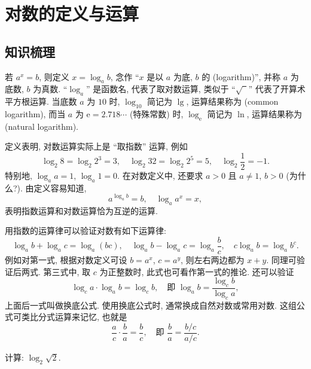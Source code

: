   \section{对数的定义与运算}

  \subsection{知识梳理}
    若 $a^x=b$, 则定义 $x=\log_a b$, 念作 ``$x$ 是以 $a$ 为底, $b$ 的 (logarithm)'', 
    并称 $a$ 为底数, $b$ 为真数. ``$\log_a$'' 是函数名, 代表了取对数运算, 
    类似于 ``$\sqrt{\phantom{2}}$'' 代表了开算术平方根运算. 当底数 $a$ 为 $10$ 时, 
    $\log_{10}$ 简记为  $\lg$, 运算结果称为 (common logarithm), 
    而当 $a$ 为 $\mathrm{e}= 2.718\cdots$ (特殊常数) 时, 
    $\log_{\mathrm{e}}$ 简记为  $\ln$, 运算结果称为 (natural logarithm). 
     
    定义表明, 对数运算实际上是 ``取指数'' 运算, 例如
    \[\log_2 8= \log_2 2^3= 3,\quad \log_2 32= \log_2 2^5= 5,\quad
      \log_2 \frac12= -1.\]
    特别地, $\log_a a=1$, $\log_a 1=0$. 在对数定义中, 还要求 $a>0$ 且 $a\neq 1$, $b>0$ (为什么?). 由定义容易知道, 
    \[a^{\log_a b}=b,\quad \log_a a^x=x,\]
    表明指数运算和对数运算恰为互逆的运算. 
    
    用指数的运算律可以验证对数有如下运算律:
    \[\log_a b+ \log_a c= \log_a (bc),\quad 
      \log_a b- \log_a c= \log_a \frac{b}c,\quad
      c\log_a b= \log_a b^c.\]
    例如对第一式, 根据对数定义可设 $b= a^x$, $c= a^y$, 则左右两边都为 $x+y$. 
    同理可验证后两式. 第三式中, 取 $c$ 为正整数时, 此式也可看作第一式的推论.
    还可以验证
     \[{\log_c a}\cdot\log_a b= \log_c b,\quad 
       \text{即\ }\log_a b= \frac{\log_c b}{\log_c a},\]
    上面后一式叫做换底公式. 使用换底公式时, 
    通常换成自然对数或常用对数. 这组公式可类比分式运算来记忆, 也就是
    \[\frac{a}c\cdot \frac{b}a= \frac{b}c,\quad
      \text{即\ }\frac{b}a= \frac{b/c}{a/c}.\]

  \lianxi
  \begin{exercise}
    计算: $\log_2 \sqrt2$.
  \end{exercise}

